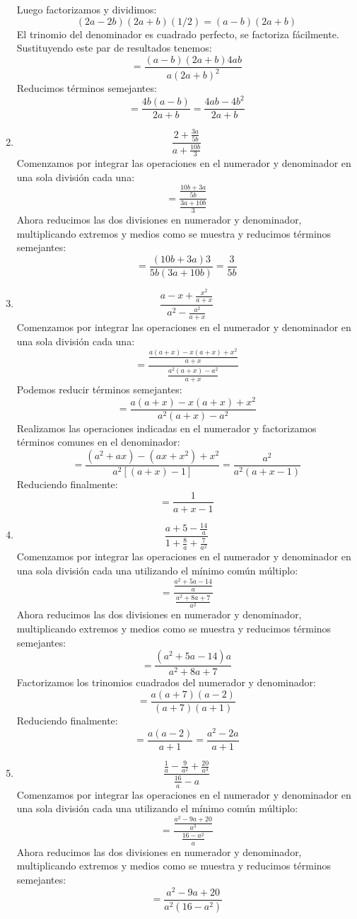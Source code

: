 \documentclass[12pt]{article}
\begin{document}
\begin{enumerate}[label=\bfseries Ejercicio \arabic*:]
Luego factorizamos y dividimos:
$$(2a - 2b)(2a + b)(1/2) = (a - b)(2a + b)$$
El trinomio del denominador es cuadrado perfecto, se factoriza fácilmente. Sustituyendo este par de resultados tenemos:
$$= \frac{(a - b)(2a + b)4ab}{a(2a + b)^2}$$
Reducimos términos semejantes:
$$= \frac{4b(a - b)}{2a + b} = \frac{4ab - 4b^2}{2a + b}$$
  \item $$\frac{2 + \frac{3a}{5b}}{a + \frac{10b}{3}}$$
Comenzamos por integrar las operaciones en el numerador y denominador en una sola división cada una:
$$= \frac{\frac{10b + 3a}{5b}}{\frac{3a + 10b}{3}}$$
Ahora reducimos las dos divisiones en numerador y denominador, multiplicando extremos y medios como se muestra y reducimos términos semejantes:
$$= \frac{(10b + 3a)3}{5b(3a + 10b)} = \frac{3}{5b}$$
  \item $$\frac{a - x + \frac{x^2}{a + x}}{a^2 - \frac{a^2}{a + x}}$$
Comenzamos por integrar las operaciones en el numerador y denominador en una sola división cada una:
$$= \frac{\frac{a(a + x) -x(a + x) + x^2}{a + x}}{\frac{a^2(a + x) - a^2}{a + x}}$$
Podemos reducir términos semejantes:
$$= \frac{a(a + x) -x(a + x) + x^2}{a^2(a + x) - a^2}$$
Realizamos las operaciones indicadas en el numerador y factorizamos términos comunes en el denominador:
$$= \frac{(a^2 + ax) - (ax + x^2) + x^2}{a^2[(a + x) - 1]} = \frac{a^2}{a^2(a + x - 1)}$$
Reduciendo finalmente:
$$= \frac{1}{a + x - 1}$$
  \item $$\frac{a + 5 - \frac{14}{a}}{1 + \frac{8}{a} + \frac{7}{a^2}}$$
Comenzamos por integrar las operaciones en el numerador y denominador en una sola división cada una utilizando el mínimo común múltiplo:
$$= \frac{\frac{a^2 + 5a - 14}{a}}{\frac{a^2 + 8a + 7}{a^2}}$$
Ahora reducimos las dos divisiones en numerador y denominador, multiplicando extremos y medios como se muestra y reducimos términos semejantes:
$$= \frac{(a^2 + 5a - 14)a}{a^2 + 8a + 7}$$
Factorizamos los trinomios cuadrados del numerador y denominador:
$$= \frac{a(a + 7)(a - 2)}{(a + 7)(a + 1)}$$
Reduciendo finalmente:
$$= \frac{a(a - 2)}{a + 1} = \frac{a^2 - 2a}{a + 1}$$
  \item $$\frac{\frac{1}{a} - \frac{9}{a^2} + \frac{20}{a^3}}{\frac{16}{a} - a}$$
Comenzamos por integrar las operaciones en el numerador y denominador en una sola división cada una utilizando el mínimo común múltiplo:
$$= \frac{\frac{a^2 - 9a + 20}{a^3}}{\frac{16 - a^2}{a}}$$
Ahora reducimos las dos divisiones en numerador y denominador, multiplicando extremos y medios como se muestra y reducimos términos semejantes:
$$= \frac{a^2 - 9a + 20}{a^2(16 - a^2)}$$

\end{enumerate}
\end{document}
